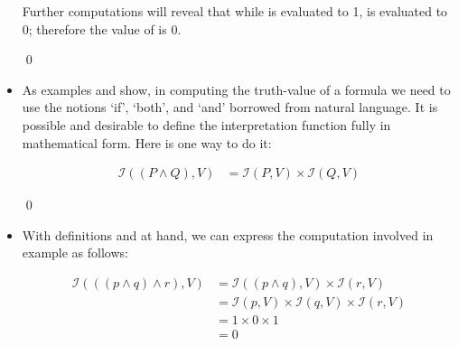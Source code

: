 \documentclass[11pt]{article}
\begin{document}
\begin{itemize}
\begin{uexample}
Further computations will reveal that while  is evaluated to 1,
 is evaluated to 0; therefore the value of  is 0. 

\qed
\end{uexample}
\hrulefill

\item As examples  and  show, in computing the
truth-value of a formula we need to use the notions `if', `both', and `and' borrowed from
natural language. It is possible and desirable to define the interpretation
function fully in mathematical form. Here is one way to do it: 

\begin{udefinition} \label{iconj2}
\begin{align*}
\mathcal{I}((P\land Q),V) & = \mathcal{I}(P,V) \times \mathcal{I}(Q,V) 
\end{align*}

\qed
\end{udefinition}

\item With definitions  and  at hand, we can express
the computation involved in example  as follows:

\begin{align}
\mathcal{I}(((p\land q)\land r), V) & = \mathcal{I}((p\land q),V) \times \mathcal{I}(r, V)\\
                                    & = \mathcal{I}(p,V)\times \mathcal{I}(q, V)\times \mathcal{I}(r, V) \nonumber \\
									& = 1 \times 0 \times 1 \nonumber \\
									& = 0
\end{align}


\end{itemize}
\end{document}
